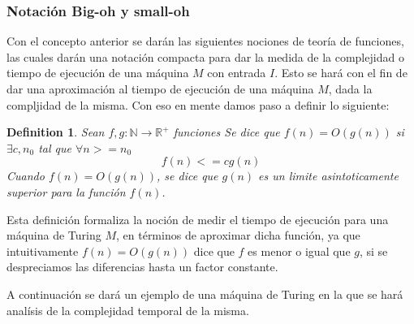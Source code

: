 \documentclass[10pt]{report}
\newtheorem{definition}{Definition}
\begin{document}
    \subsubsection{Notación Big-oh y small-oh}
    Con el concepto anterior se darán las siguientes nociones de teoría de funciones, las cuales darán una notación
    compacta para dar la medida de la complejidad o tiempo de ejecución de una máquina $M$ con entrada $I$.
    Esto se hará con el fin de dar una aproximación al tiempo de ejecución de una máquina $M$, dada la compljidad de la
    misma.
    \newline
    Con eso en mente damos paso a definir lo siguiente:
    \begin{definition}
        Sean $f,g:\mathbb{N}\rightarrow\mathbb{R}^+$ funciones\newline
        Se dice que $f(n) = O(g(n))$ \newline
        si $\exists c, n_{0}$ tal que $\forall n >= n_{0}$
        \begin{equation}
            f(n) <= cg(n)\label{eq:equation6}
        \end{equation}
        Cuando $f(n) = O(g(n))$, se dice que $g(n)$ es un limite asintoticamente superior
        para la función $f(n)$.
    \end{definition}
    Esta definición formaliza la noción de medir el tiempo de ejecución para una máquina de Turing $M$, en términos
    de aproximar dicha función, ya que intuitivamente $f(n) = O(g(n)) $ dice que $f$ es menor o igual que $g$, si se
    despreciamos las diferencias hasta un factor constante.

    A continuación se dará un ejemplo de una máquina de Turing en la que se hará analísis de la complejidad temporal
    de la misma.
\end{document}
